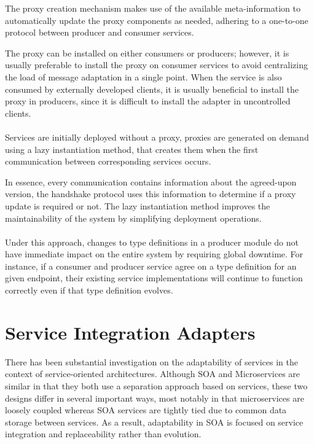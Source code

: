 The proxy creation mechanism makes use of the available meta-information
to automatically update the proxy components as needed, adhering to a one-to-one protocol between producer and consumer services.

The proxy can be installed on either consumers or producers;
however, it is usually preferable to install the proxy on consumer services to avoid centralizing the load of message adaptation in a single point.
When the service is also consumed by externally developed clients,
it is usually beneficial to install the proxy in producers, since it is difficult to install the adapter in uncontrolled clients.

\paragraph{}

Services are initially deployed without a proxy, proxies are generated on demand using a lazy instantiation method, that creates them when the first communication between corresponding services occurs.

In essence, every communication contains information about the agreed-upon version, the handshake protocol uses this information to determine if a proxy update is required or not.
The lazy instantiation method improves the maintainability of the system by
simplifying deployment operations.

\paragraph{}

Under this approach, changes to type definitions in a producer module do not have immediate impact on the entire system by requiring global downtime.
For instance, if a consumer and producer service agree on a type definition for an given endpoint,
their existing service implementations will continue to function correctly even if that type definition evolves.

\section{Service Integration Adapters} %
\label{sec:service_integration_adapters}

There has been substantial investigation on the adaptability of services in the context of service-oriented architectures.
Although SOA \cite{7} and Microservices \cite{14} are similar in that they both use a separation approach based on services,
these two designs differ in several important ways, most notably in that microservices are loosely coupled whereas SOA services are tightly tied due to common data storage between services.
As a result, adaptability in SOA is focused on service integration and replaceability rather than evolution.

